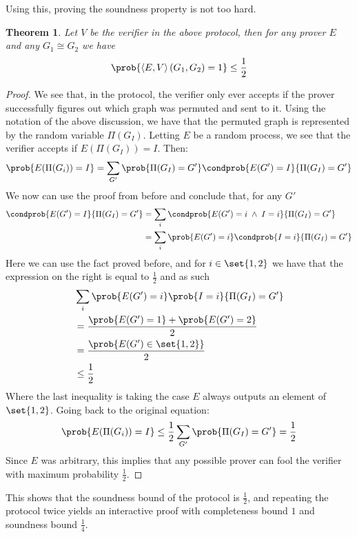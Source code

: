 \documentclass{article}
\newtheorem{theorem}{Theorem}
\begin{document}
Using this, proving the soundness property is not too hard.
\begin{theorem}
    Let $V$ be the verifier in the above protocol, then for any  prover $E$ and any $G_1  \cong G_2$ we have \[ \prob{\left<E, V\right>(G_1, G_2) = 1} \leq \frac{1}{2} \]
\end{theorem}
\begin{proof}
    We see that, in the protocol, the verifier only ever accepts if the prover successfully figures out which graph was permuted and sent to it. Using the notation of the above discussion, we have that the permuted graph is represented by the random variable $\Pi(G_I)$. Letting $E$ be a random process, we see that the verifier accepts if $E(\Pi(G_I)) = I$. Then:
    \[ \prob{E(\Pi(G_i)) = I} = \sum_{G'} \prob{\Pi(G_I) = G'} \condprob{E(G') = I}{\Pi(G_I) = G'} \]
    We now can use the proof from before and conclude that, for any $G'$
    \begin{align*}
        \condprob{E(G') = I}{\Pi(G_I) = G'} & = \sum_i \condprob{E(G') = i \; \land \; I = i}{\Pi(G_I) = G'} \\
                                            & = \sum_i \prob{E(G') = i } \condprob{ I = i}{\Pi(G_I) = G'}
    \end{align*}
    Here we can use the fact proved before, and for $i \in \set{1, 2}$ we have that the expression on the right is equal to $\frac{1}{2}$ and as such
    \begin{align*}
         & \sum_i \prob{E(G') = i } \prob{ I = i}{\Pi(G_I) = G' } \\
         & = \frac{\prob{E(G') = 1 } + \prob{E(G') = 2}}{2}       \\
         & = \frac{\prob{E(G') \in \set{ 1, 2}}}{2}               \\
         & \leq \frac{1}{2}
    \end{align*}
    Where the last inequality is taking the case $E$ always outputs an element of $ \set{ 1, 2}$. Going back to the original equation:
    \[\prob{E(\Pi(G_i)) = I} \leq \frac{1}{2} \sum_{G'} \prob{\Pi(G_I) = G'} = \frac{1}{2} \]
    Since $E$ was arbitrary, this implies that any possible prover can fool the verifier with maximum probability $\frac{1}{2}$.
\end{proof}

This shows that the soundness bound of the protocol is $\frac{1}{2}$, and repeating the protocol twice yields an interactive proof with completeness bound $1$ and soundness bound $\frac{1}{4}$.
\end{document}
